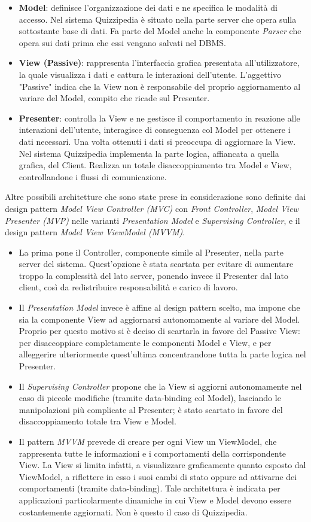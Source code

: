\documentclass[a4paper,11pt]{article}
\begin{document}
\begin {itemize}
\item\textbf{Model}: definisce l'organizzazione dei dati e ne specifica le modalità di accesso. Nel sistema Quizzipedia è situato nella parte server che opera sulla sottostante base di dati. Fa parte del Model anche la componente \emph{Parser} che opera sui dati prima che essi vengano salvati nel DBMS.
\item\textbf{View (Passive)}: rappresenta l'interfaccia grafica presentata all'utilizzatore, la quale visualizza i dati e cattura le interazioni dell'utente. L'aggettivo "Passive" indica che la View non è responsabile del proprio aggiornamento al variare del Model, compito che ricade sul Presenter.
\item\textbf{Presenter}: controlla la View e ne gestisce il comportamento in reazione alle interazioni dell'utente, interagisce di conseguenza col Model per ottenere i dati necessari.
Una volta ottenuti i dati si preoccupa di aggiornare la View. Nel sistema Quizzipedia implementa la parte logica, affiancata a quella grafica, del Client. Realizza un totale disaccoppiamento tra Model e View, controllandone i flussi di comunicazione.
	\end {itemize}
	Altre possibili architetture che sono state prese in considerazione sono definite dai design pattern \emph{Model View Controller (MVC)} con \emph{Front Controller}, \emph{Model View Presenter (MVP)} nelle varianti \emph{Presentation Model} e \emph{Supervising Controller}, e il design pattern \emph{Model View ViewModel (MVVM)}.
	\begin{itemize}
	\item La prima pone il Controller, componente simile al Presenter, nella parte server del sistema. Quest'opzione è stata scartata per evitare di aumentare troppo la complessità del lato server, ponendo invece il Presenter dal lato client, così da redistribuire responsabilità e carico di lavoro.
	\item Il \emph{Presentation Model} invece è affine al design pattern scelto, ma impone che sia la componente View ad aggiornarsi autonomamente al variare del Model. Proprio per questo motivo si è deciso di scartarla in favore del Passive View: per disaccoppiare completamente le componenti Model e View, e per alleggerire ulteriormente quest'ultima concentrandone tutta la parte logica nel Presenter.
	\item Il \emph{Supervising Controller} propone che la View si aggiorni autonomamente nel caso di piccole modifiche (tramite data-binding col Model), lasciando le manipolazioni più complicate al Presenter; è stato scartato in favore del disaccoppiamento totale tra View e Model.
	\item Il pattern \emph{MVVM} prevede di creare per ogni View un ViewModel, che rappresenta tutte le informazioni e i comportamenti della corrispondente View. La View si limita infatti, a visualizzare graficamente quanto esposto dal ViewModel, a riflettere in esso i suoi cambi di stato oppure ad attivarne dei comportamenti (tramite data-binding). Tale architettura è indicata per applicazioni particolarmente dinamiche in cui View e Model devono essere costantemente aggiornati. Non è questo il caso di Quizzipedia.
	\end{itemize}
\end{document}
